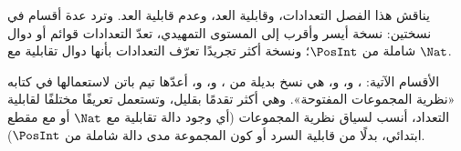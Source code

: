 \documentclass[../../../include/open-logic-chapter]{subfiles}
\begin{document}

\begin{editorial}
يناقش هذا الفصل التعدادات، وقابلية العد، وعدم قابلية العد. وترد عدة
أقسام في نسختين: نسخة أيسر وأقرب إلى المستوى التمهيدي، تعدّ التعدادات
قوائم أو دوال شاملة من $\PosInt$؛ ونسخة أكثر تجريدًا تعرّف التعدادات
بأنها دوال تقابلية مع $\Nat$.
\end{editorial}











\begin{editorial}
الأقسام الآتية: ،
و، و، هي
نسخ بديلة من ،
و، و، أعدّها تيم باتن
لاستعمالها في كتابه «نظرية المجموعات المفتوحة». وهي أكثر تقدمًا
بقليل، وتستعمل تعريفًا مختلفًا لقابلية التعداد، أنسب لسياق نظرية
المجموعات (أي وجود دالة تقابلية مع $\Nat$ أو مع مقطع ابتدائي، بدلًا من
قابلية السرد أو كون المجموعة مدى دالة شاملة من $\PosInt$).
\end{editorial}


\OLEndChapterHook
\end{document}
